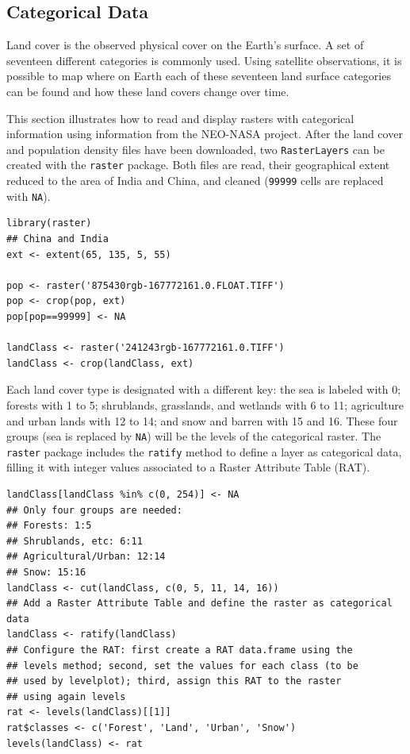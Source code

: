 \documentclass[smallroyalvopaper]{memoir}
\begin{document}
\subsection{Categorical Data}
\label{sec-1-2}
Land cover is the observed physical cover on the Earth's surface. A
set of seventeen different categories is commonly used. Using
satellite observations, it is possible to map where on Earth each of
these seventeen land surface categories can be found and how these
land covers change over time.

This section illustrates how to read and display rasters with
categorical information using information from the NEO-NASA
project. After the land cover and population density files have been
downloaded, two \texttt{RasterLayers} can be created with the \texttt{raster}
package. Both files are read, their geographical extent reduced to the
area of India and China, and cleaned (\texttt{99999} cells are replaced with
\texttt{NA}).


\lstset{language=R,numbers=none}
\begin{lstlisting}
library(raster)
## China and India  
ext <- extent(65, 135, 5, 55)

pop <- raster('875430rgb-167772161.0.FLOAT.TIFF')
pop <- crop(pop, ext)
pop[pop==99999] <- NA

landClass <- raster('241243rgb-167772161.0.TIFF')
landClass <- crop(landClass, ext)
\end{lstlisting}

Each land cover type is designated with a different key: the sea is
labeled with 0; forests with 1 to 5; shrublands, grasslands, and
wetlands with 6 to 11; agriculture and urban lands with 12 to 14; and
snow and barren with 15 and 16.  These four groups (sea is replaced by
\texttt{NA}) will be the levels of the categorical raster. The \texttt{raster}
package includes the \texttt{ratify} method to define a layer as categorical
data, filling it with integer values associated to a Raster Attribute
Table (RAT).



\lstset{language=R,numbers=none}
\begin{lstlisting}
landClass[landClass %in% c(0, 254)] <- NA
## Only four groups are needed:
## Forests: 1:5
## Shrublands, etc: 6:11
## Agricultural/Urban: 12:14
## Snow: 15:16
landClass <- cut(landClass, c(0, 5, 11, 14, 16))
## Add a Raster Attribute Table and define the raster as categorical data
landClass <- ratify(landClass)
## Configure the RAT: first create a RAT data.frame using the
## levels method; second, set the values for each class (to be
## used by levelplot); third, assign this RAT to the raster
## using again levels
rat <- levels(landClass)[[1]]
rat$classes <- c('Forest', 'Land', 'Urban', 'Snow')
levels(landClass) <- rat
\end{lstlisting}
\end{document}
